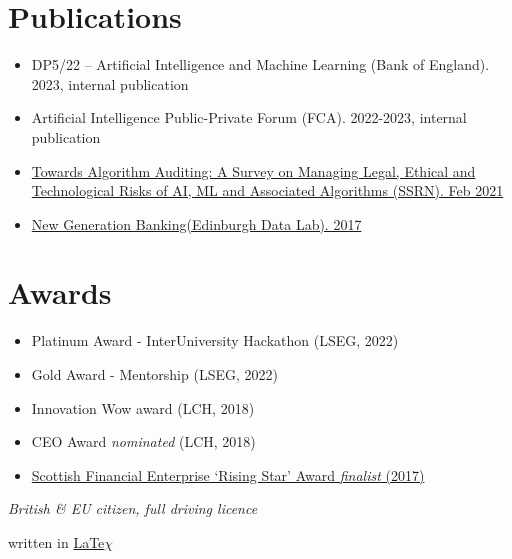 \documentclass[10pt]{article} %
\newcommand{\resumeItemListStart}{
    \begin{itemize}[
        noitemsep,
        leftmargin=3.5mm,
        rightmargin=0mm,
        topsep=2pt,
        label=\textbullet
        ]
    }
\newcommand{\resumeItemListEnd}{\end{itemize}\vspace{-5pt}}
\begin{document}
\begin{paracol}{2}
\section{Publications}
\resumeItemListStart
    \item DP5/22 – Artificial Intelligence and Machine Learning (Bank of England). 2023, internal publication
    \item Artificial Intelligence Public-Private Forum (FCA). 2022-2023, internal publication 
    \item \href{https://papers.ssrn.com/sol3/papers.cfm?abstract_id=3778998}{Towards Algorithm Auditing: A Survey on Managing Legal, Ethical and Technological Risks of AI, ML and Associated Algorithms (SSRN). Feb 2021} 
    \item \href{https://www.youtube.com/watch?v=IwCscS-XBc4}{New Generation Banking(Edinburgh Data Lab). 2017}
\resumeItemListEnd

\section{Awards}
\resumeItemListStart
    \item Platinum Award - InterUniversity Hackathon (LSEG, 2022)
    \item Gold Award - Mentorship (LSEG, 2022)
    \item Innovation Wow award (LCH, 2018)
    \item CEO Award \emph{nominated} (LCH, 2018)
    \item \href{https://www.scottishfinancialnews.com/articles/finalists-announced-for-scottish-financial-services-awards-2017}{Scottish Financial Enterprise ‘Rising Star’ Award \emph{finalist} (2017)}
\resumeItemListEnd

\medskip
\emph{British \& EU citizen, full driving licence}

\switchcolumn*
\end{paracol}

\vspace*{\fill}

\raggedleft\tiny{
  written in  
  \href{https://github.com/Gregomiro/LaTeX/blob/main/Miro_Gregorovic_CV.tex}{LaTe$\chi$}
}
\end{document}
